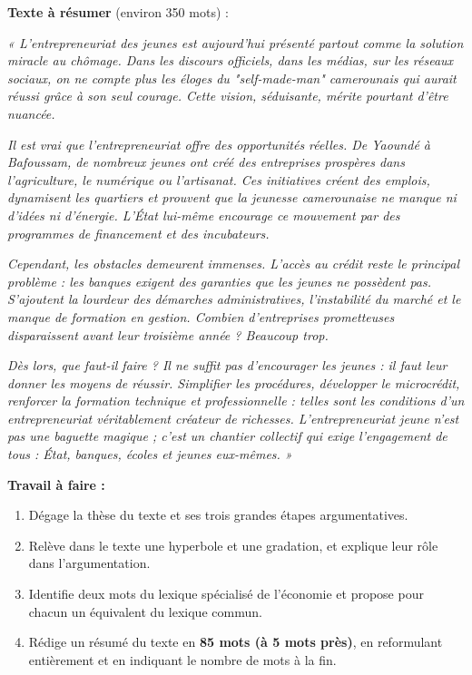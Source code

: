 \documentclass[11pt]{article}
\begin{document}
\begin{exercice}
\textbf{Texte à résumer} (environ 350 mots) :

\emph{« L'entrepreneuriat des jeunes est aujourd'hui présenté partout comme la solution miracle au chômage. Dans les discours officiels, dans les médias, sur les réseaux sociaux, on ne compte plus les éloges du "self-made-man" camerounais qui aurait réussi grâce à son seul courage. Cette vision, séduisante, mérite pourtant d'être nuancée.}

\emph{Il est vrai que l'entrepreneuriat offre des opportunités réelles. De Yaoundé à Bafoussam, de nombreux jeunes ont créé des entreprises prospères dans l'agriculture, le numérique ou l'artisanat. Ces initiatives créent des emplois, dynamisent les quartiers et prouvent que la jeunesse camerounaise ne manque ni d'idées ni d'énergie. L'État lui-même encourage ce mouvement par des programmes de financement et des incubateurs.}

\emph{Cependant, les obstacles demeurent immenses. L'accès au crédit reste le principal problème : les banques exigent des garanties que les jeunes ne possèdent pas. S'ajoutent la lourdeur des démarches administratives, l'instabilité du marché et le manque de formation en gestion. Combien d'entreprises prometteuses disparaissent avant leur troisième année ? Beaucoup trop.}

\emph{Dès lors, que faut-il faire ? Il ne suffit pas d'encourager les jeunes : il faut leur donner les moyens de réussir. Simplifier les procédures, développer le microcrédit, renforcer la formation technique et professionnelle : telles sont les conditions d'un entrepreneuriat véritablement créateur de richesses. L'entrepreneuriat jeune n'est pas une baguette magique ; c'est un chantier collectif qui exige l'engagement de tous : État, banques, écoles et jeunes eux-mêmes. »}

\textbf{Travail à faire :}
\begin{enumerate}
\item Dégage la thèse du texte et ses trois grandes étapes argumentatives.
\item Relève dans le texte une hyperbole et une gradation, et explique leur rôle dans l'argumentation.
\item Identifie deux mots du lexique spécialisé de l'économie et propose pour chacun un équivalent du lexique commun.
\item Rédige un résumé du texte en \textbf{85 mots (à 5 mots près)}, en reformulant entièrement et en indiquant le nombre de mots à la fin.
\end{enumerate}
\end{exercice}
\end{document}
